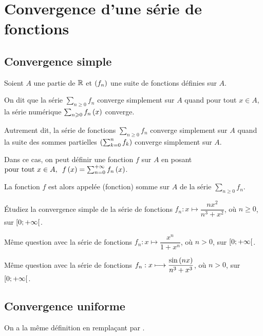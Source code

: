 \section{Convergence d'une série de fonctions}

\subsection{Convergence simple}

\begin{defi}
Soient \(A\) une partie de \(\mathbb{R}\) et \(\left(f_n\right)\) une suite de fonctions définies sur \(A\).

On dit que la série \(\sum_{n\geq0}f_n\) converge simplement sur \(A\) quand pour tout \(x\in A\), la série numérique \(\sum_{n\geqslant0}f_n\left(x\right)\) converge.

Autrement dit, la série de fonctions \(\sum_{n\geq0}f_n\) converge simplement sur \(A\) quand la suite des sommes partielles \(\left(\sum_{k=0}^nf_k\right)\) converge simplement sur \(A\).

Dans ce cas, on peut définir une fonction \(f\) sur \(A\) en posant \(\quantifs{\tpt x\in A}f\paren{x}=\sum_{n=0}^{\pinf}f_n\paren{x}\).

La fonction \(f\) est alors appelée (fonction) somme sur \(A\) de la série \(\sum_{n\geq0}f_n\).
\end{defi}

\begin{exo}
Étudiez la convergence simple de la série de fonctions \(f_n:x\mapsto\dfrac{nx^2}{n^3+x^2}\), où \(n\geq0\), sur \(\left[0;+\infty\right[\).
\end{exo}

\begin{exo}
Même question avec la série de fonctions \(f_n:x\mapsto\dfrac{x^n}{1+x^n}\), où \(n>0\), sur \(\left[0;+\infty\right[\).
\end{exo}

\begin{exo}
Même question avec la série de fonctions \(f_n:x\longmapsto\dfrac{\sin\left(nx\right)}{n^3+x^3}\), où \(n>0\), sur \(\left[0;+\infty\right[\).
\end{exo}

\subsection{Convergence uniforme}

On a la même définition en remplaçant  par .

